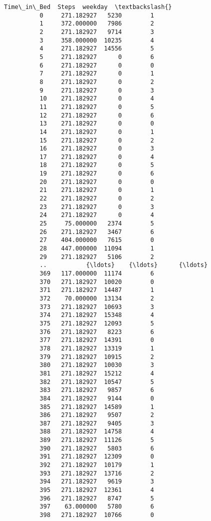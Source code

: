 \documentclass[11pt]{article}
\begin{document}
\begin{Verbatim}[commandchars=\\\{\}]
               Time\_in\_Bed  Steps  weekday  \textbackslash{}
          0     271.182927   5230        1   
          1     372.000000   7986        2   
          2     271.182927   9714        3   
          3     358.000000  10235        4   
          4     271.182927  14556        5   
          5     271.182927      0        6   
          6     271.182927      0        0   
          7     271.182927      0        1   
          8     271.182927      0        2   
          9     271.182927      0        3   
          10    271.182927      0        4   
          11    271.182927      0        5   
          12    271.182927      0        6   
          13    271.182927      0        0   
          14    271.182927      0        1   
          15    271.182927      0        2   
          16    271.182927      0        3   
          17    271.182927      0        4   
          18    271.182927      0        5   
          19    271.182927      0        6   
          20    271.182927      0        0   
          21    271.182927      0        1   
          22    271.182927      0        2   
          23    271.182927      0        3   
          24    271.182927      0        4   
          25     75.000000   2374        5   
          26    271.182927   3467        6   
          27    404.000000   7615        0   
          28    447.000000  11094        1   
          29    271.182927   5106        2   
          ..           {\ldots}    {\ldots}      {\ldots}   
          369   117.000000  11174        6   
          370   271.182927  10020        0   
          371   271.182927  14487        1   
          372    70.000000  13134        2   
          373   271.182927  10693        3   
          374   271.182927  15348        4   
          375   271.182927  12093        5   
          376   271.182927   8223        6   
          377   271.182927  14391        0   
          378   271.182927  13319        1   
          379   271.182927  10915        2   
          380   271.182927  10030        3   
          381   271.182927  15212        4   
          382   271.182927  10547        5   
          383   271.182927   9857        6   
          384   271.182927   9144        0   
          385   271.182927  14589        1   
          386   271.182927   9507        2   
          387   271.182927   9405        3   
          388   271.182927  14758        4   
          389   271.182927  11126        5   
          390   271.182927   5803        6   
          391   271.182927  12309        0   
          392   271.182927  10179        1   
          393   271.182927  13716        2   
          394   271.182927   9619        3   
          395   271.182927  12361        4   
          396   271.182927   8747        5   
          397    63.000000   5780        6   
          398   271.182927  10766        0   
          

\end{Verbatim}
\end{document}
